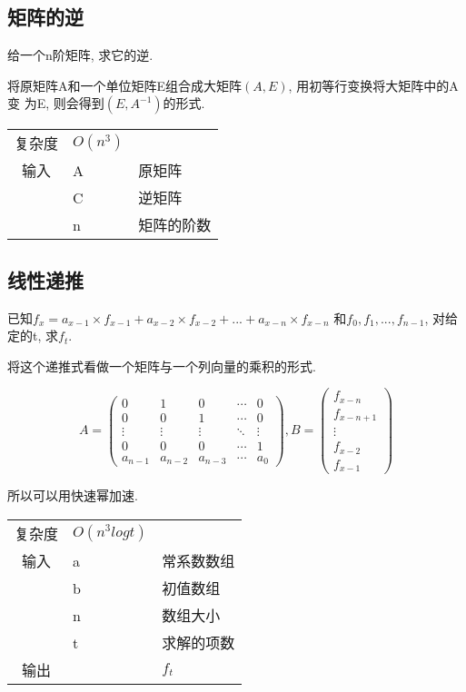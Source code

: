     \subsection{矩阵的逆}\small
给一个n阶矩阵, 求它的逆.

将原矩阵A和一个单位矩阵E组合成大矩阵$(A, E)$, 用初等行变换将大矩阵中的A变
为E, 则会得到$(E, A^{-1})$的形式.
\begin{longtable}{|c|l|l|}
复杂度 & $O(n^3)$ & \\
输入 & A & 原矩阵 \\
 & C & 逆矩阵 \\
 & n & 矩阵的阶数 \\
\end{longtable}



    \subsection{线性递推}\small
已知$f_x = a_{x-1} \times f_{x-1} + a_{x-2} \times f_{x-2} + ... + a_{x-n} \times f_{x-n}$
和$f_0, f_1, ..., f_{n-1}$, 对给定的t, 求$f_t$.

将这个递推式看做一个矩阵与一个列向量的乘积的形式.

\[A = \left( {\begin{array}{*{20}{c}}
0&1&0& \cdots &0\\
0&0&1& \cdots &0\\
 \vdots & \vdots & \vdots & \ddots & \vdots \\
0&0&0& \cdots &1\\
{{a_{n - 1}}}&{{a_{n - 2}}}&{{a_{n - 3}}}& \cdots &{{a_0}}
\end{array}} \right),B = \left( {\begin{array}{*{20}{c}}
{{f_{x - n}}}\\
{{f_{x - n + 1}}}\\
 \vdots \\
{{f_{x - 2}}}\\
{{f_{x - 1}}}
\end{array}} \right)\]

所以可以用快速幂加速.
\begin{longtable}{|c|l|l|}
复杂度 & $O(n^{3}logt)$ & \\
输入 & a & 常系数数组 \\
 & b & 初值数组 \\
 & n & 数组大小 \\
 & t & 求解的项数 \\
输出 &  & $f_t$ \\
\end{longtable}



